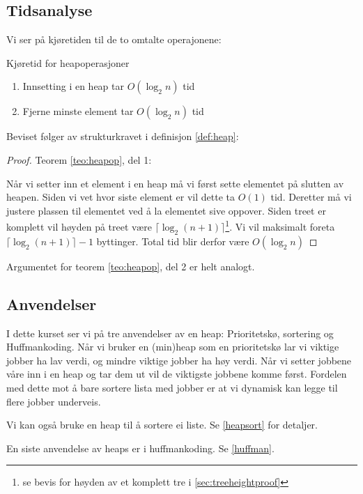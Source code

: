 \newpage
\subsection{Tidsanalyse}
Vi ser på kjøretiden til de to omtalte operajonene:
\begin{theorem} Kjøretid for heapoperasjoner \label{teo:heapop}
	\begin{enumerate}
		\item Innsetting i en heap tar $ O(\log_2 n) $ tid
		\item Fjerne minste element tar $ O(\log_2 n) $ tid
	\end{enumerate}
\end{theorem}
Beviset følger av strukturkravet i definisjon \ref{def:heap}:
\begin{proof} Teorem \ref{teo:heapop}, del 1:
	
	Når vi setter inn et element i en heap må vi først sette elementet på slutten av heapen. Siden vi vet hvor siste element er vil dette ta $ O(1) $ tid. Deretter må vi justere plassen til elementet ved å la elementet sive oppover. Siden treet er komplett vil høyden på treet være $ \lceil\log_2 (n+1)\rceil $\footnote{se bevis for høyden av et komplett tre i \ref{sec:treeheightproof}}. Vi vil maksimalt foreta $ \lceil\log_2 (n+1)\rceil - 1 $ byttinger. Total tid blir derfor være $ O(\log_2 n) $
\end{proof}
Argumentet for teorem \ref{teo:heapop}, del 2 er helt analogt. 


\subsection{Anvendelser}
I dette kurset ser vi på tre anvendelser av en heap: Prioritetskø, sortering og Huffmankoding. Når vi bruker en (min)heap som en prioritetskø lar vi viktige jobber ha lav verdi, og mindre viktige jobber ha høy verdi. Når vi setter jobbene våre inn i en heap og tar dem ut vil de viktigste jobbene komme først. Fordelen med dette mot å bare sortere lista med jobber er at vi dynamisk kan legge til flere jobber underveis. 

Vi kan også bruke en heap til å sortere ei liste. Se \ref{heapsort} for detaljer.

En siste anvendelse av heaps er i huffmankoding. Se \ref{huffman}.

